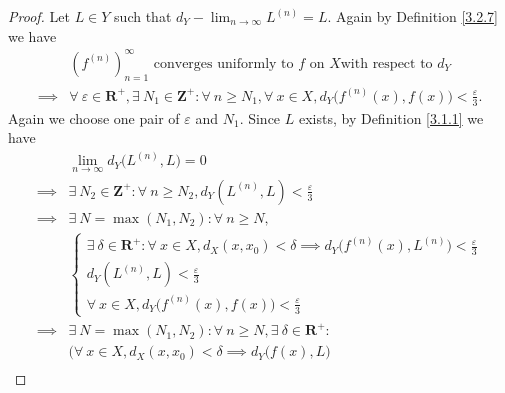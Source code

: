 \begin{proof}
    Let \(L \in Y\) such that \(d_Y - \lim_{n \to \infty} L^{(n)} = L\).
    Again by Definition \ref{3.2.7} we have
    \begin{align*}
                 & (f^{(n)})_{n = 1}^\infty \text{ converges uniformly to } f \text{ on } X \text{with respect to } d_Y                                                                 \\
        \implies & \forall\ \varepsilon \in \mathbf{R}^+, \exists\ N_1 \in \mathbf{Z}^+ : \forall\ n \geq N_1, \forall\ x \in X, d_Y\big(f^{(n)}(x), f(x)\big) < \frac{\varepsilon}{3}.
    \end{align*}
    Again we choose one pair of \(\varepsilon\) and \(N_1\).
    Since \(L\) exists, by Definition \ref{3.1.1} we have
    \begin{align*}
                 & \lim_{n \to \infty} d_Y\big(L^{(n)}, L\big) = 0                                                                                                                              \\
        \implies & \exists\ N_2 \in \mathbf{Z}^+ : \forall\ n \geq N_2, d_Y(L^{(n)}, L) < \frac{\varepsilon}{3}                                                                                 \\
        \implies & \exists\ N = \max(N_1, N_2) : \forall\ n \geq N,                                                                                                                             \\
                 & \begin{cases}
            \exists\ \delta \in \mathbf{R}^+ : \forall\ x \in X, d_X(x, x_0) < \delta \implies d_Y\big(f^{(n)}(x), L^{(n)}\big) < \frac{\varepsilon}{3} \\
            d_Y(L^{(n)}, L) < \frac{\varepsilon}{3}                                                                                                     \\
            \forall\ x \in X, d_Y\big(f^{(n)}(x), f(x)\big) < \frac{\varepsilon}{3}
        \end{cases}                                                                                                                                                   \\
        \implies & \exists\ N = \max(N_1, N_2) : \forall\ n \geq N, \exists\ \delta \in \mathbf{R}^+ :                                                                                          \\
                 & \Big(\forall\ x \in X, d_X(x, x_0) < \delta \implies d_Y\big(f(x), L\big)                                                                                                    \\

\end{align*}
\end{proof}
